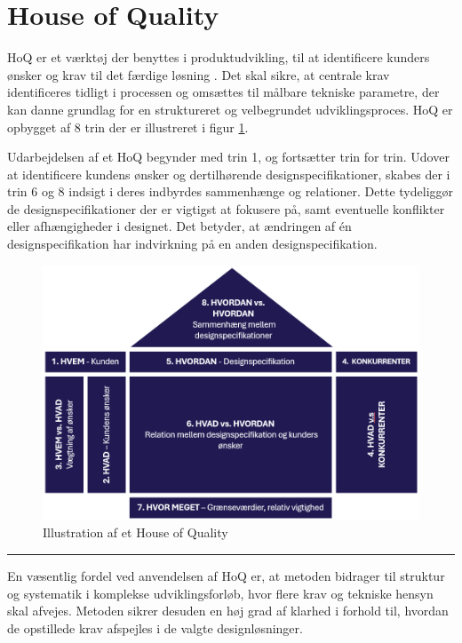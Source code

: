 \section{House of Quality} \label{House of Quality}
HoQ er et værktøj der benyttes i produktudvikling, til at identificere kunders ønsker og krav til det færdige løsning \parencite{Ullman2018TheProcess}. Det skal sikre, at centrale krav identificeres tidligt i processen og omsættes til målbare tekniske parametre, der kan danne grundlag for en struktureret og velbegrundet udviklingsproces. HoQ er opbygget af 8 trin der er illustreret i figur \ref{fig: HOQ illustration}.  

Udarbejdelsen af et HoQ begynder med trin 1, og fortsætter trin for trin. Udover at identificere kundens ønsker og dertilhørende designspecifikationer, skabes der i trin 6 og 8 indsigt i deres indbyrdes sammenhænge og relationer. Dette tydeliggør de designspecifikationer der er vigtigst at fokusere på, samt eventuelle konflikter eller afhængigheder i designet. Det betyder, at ændringen af én designspecifikation har indvirkning på en anden designspecifikation. 

\begin{figure}[H]
    \centering
    \includegraphics[width=1\linewidth]{Sections/4 Kravspecifikation/Media/HOQ1.png}
    \caption{Illustration af et House of Quality}
    \label{fig: HOQ illustration}
\end{figure} \plainbreak{-0.5}

En væsentlig fordel ved anvendelsen af HoQ er, at metoden bidrager til struktur og systematik i komplekse udviklingsforløb, hvor flere krav og tekniske hensyn skal afvejes. Metoden sikrer desuden en høj grad af klarhed i forhold til, hvordan de opstillede krav afspejles i de valgte designløsninger.



